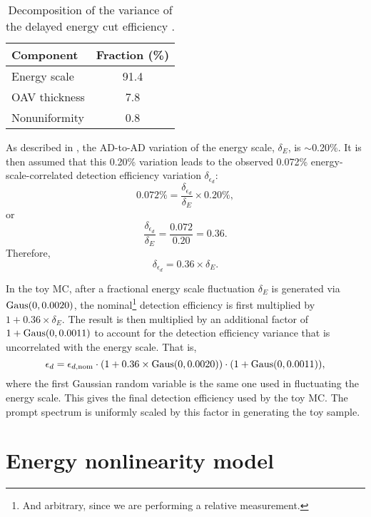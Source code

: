 \documentclass[../thesis.tex]{subfiles}
\begin{document}
\begin{table}[ht]
  \begin{tabular}{lc}
    \toprule
    Component & Fraction (\%) \\
    \midrule
    Energy scale & 91.4 \\
    OAV thickness & 7.8 \\
    Nonuniformity & 0.8 \\
    \bottomrule
  \end{tabular}
  \caption{Decomposition of the variance of the delayed energy cut efficiency \cite{loganDetEff}.}
  \label{tab:delayedEffVariance}
\end{table}

As described in \cite[Sec.\@ III B 5 b]{An_2017}, the AD-to-AD variation of the energy scale, $\delta_E$, is $\sim$0.20\%. It is then assumed that this 0.20\% variation leads to the observed 0.072\% energy-scale-correlated detection efficiency variation $\delta_{\epsilon_d}$:
\begin{equation}
  0.072\% = \frac{\delta_{\epsilon_d}}{\delta_E} \times 0.20\%,
\end{equation}
or
\begin{equation}
  \frac{\delta_{\epsilon_d}}{\delta_E} = \frac{0.072}{0.20} = 0.36.
\end{equation}
Therefore,
\begin{equation}
  \delta_{\epsilon_d} = 0.36 \times \delta_E.
\end{equation}

In the toy MC, after a fractional energy scale fluctuation $\delta_E$ is generated via $\operatorname{Gaus}(0, 0.0020)$, the nominal\footnote{And arbitrary, since we are performing a relative measurement.} detection efficiency is first multiplied by $1 + 0.36 \times \delta_E$. The result is then multiplied by an additional factor of $1 + \operatorname{Gaus}(0, 0.0011)$ to account for the detection efficiency variance that is uncorrelated with the energy scale. That is,
\begin{equation}
  \epsilon_d = \epsilon_{d,\mathrm{nom}} \cdot (1 + 0.36 \times \operatorname{Gaus}(0, 0.0020)) \cdot (1 + \operatorname{Gaus}(0, 0.0011)),
\end{equation}
where the first Gaussian random variable is the same one used in fluctuating the energy scale. This gives the final detection efficiency used by the toy MC. The prompt spectrum is uniformly scaled by this factor in generating the toy sample.

\section{Energy nonlinearity model}
\label{sec:reconEnergyNLDetails}
\end{document}
